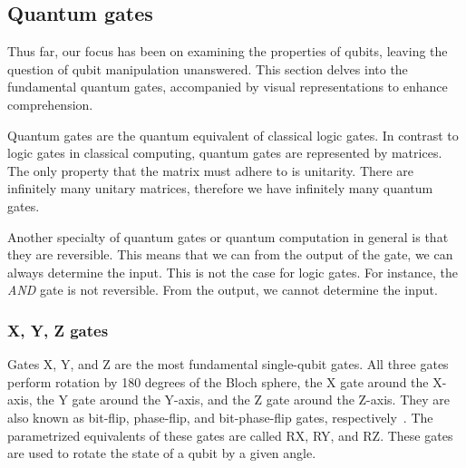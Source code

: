 \subsection{Quantum gates}
Thus far, our focus has been on examining the properties of qubits, leaving the question of qubit manipulation unanswered. This section delves into the fundamental quantum gates, accompanied by visual representations to enhance comprehension.

Quantum gates are the quantum equivalent of classical logic gates. In contrast to logic gates in classical computing, quantum gates are represented by matrices. The only property that the matrix must adhere to is unitarity. There are infinitely many unitary matrices, therefore we have infinitely many quantum gates. \cite{qc}

Another specialty of quantum gates or quantum computation in general is that they are reversible. This means that we can from the output of the gate, we can always determine the input. This is not the case for logic gates. For instance, the \textit{AND} gate is not reversible. From the output, we cannot determine the input. \cite{qc}

\subsubsection{X, Y, Z gates}
Gates X, Y, and Z are the most fundamental single-qubit gates. All three gates perform rotation by 180 degrees of the Bloch sphere, the X gate around the X-axis, the Y gate around the Y-axis, and the Z gate around the Z-axis. They are also known as bit-flip, phase-flip, and bit-phase-flip gates, respectively~\cite{qc}. The parametrized equivalents of these gates are called RX, RY, and RZ. These gates are used to rotate the state of a qubit by a given angle.

